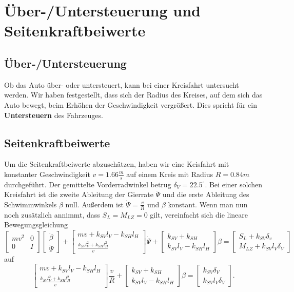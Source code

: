 \section{Über-/Untersteuerung und Seitenkraftbeiwerte}
\subsection{Über-/Untersteuerung}
Ob das Auto über- oder untersteuert, kann bei einer Kreisfahrt  untersucht werden. Wir haben festgestellt, dass sich der Radius des Kreises, auf dem sich das Auto bewegt, beim Erhöhen der Geschwindigkeit vergrößert. Dies spricht für ein \textbf{Untersteuern} des Fahrzeuges.

\subsection{Seitenkraftbeiwerte}

Um die Seitenkraftbeiwerte abzuschätzen, haben wir eine Keisfahrt mit konstanter Geschwindigkeit $v=1.66\frac{m}{s}$ auf einem Kreis mit Radius $R=0.84m$ durchgeführt. Der gemittelte Vorderradwinkel betrug $\delta_V=22.5^\circ$. Bei einer solchen Kreisfahrt ist die zweite Ableitung der Gierrate $\ddot{\Psi}$ und die erste Ableitung des Schwimmwinkels $ \beta$ null. Außerdem ist $\dot{\Psi}=\frac{v}{R}$ und $\beta$ konstant. Wenn man nun noch zusätzlich annimmt, dass $S_L=M_{LZ}=0$ gilt, vereinfacht sich die lineare Bewegungsgleichung
$$ \begin{bmatrix} 
mv^2 & 0 \\
0 & I 
\end{bmatrix} 
\begin{bmatrix} 
\dot{\beta} \\
\ddot{\Psi}
\end{bmatrix}+ 
\begin{bmatrix} 
mv+k_{SV}l_V-k_{SH}l_{H} \\
\frac{k_{SV}l_V^2+k_{SH}l_H^2}{v}  
\end{bmatrix} \dot{\Psi}+
\begin{bmatrix} 
k_{SV}+k_{SH} \\
k_{SV}l_V-k_{SH}l_H 
\end{bmatrix} \beta=
\begin{bmatrix} 
S_L+k_{SV}\delta_v \\
M_{LZ}+k_{SV}l_V\delta_V 
\end{bmatrix}
$$
auf 
$$  
\begin{bmatrix} 
mv+k_{SV}l_V-k_{SH}l_{H} \\
\frac{k_{SV}l_V^2+k_{SH}l_H^2}{v}  
\end{bmatrix} \frac{v}{R}+
\begin{bmatrix} 
k_{SV}+k_{SH} \\
k_{SV}l_V-k_{SH}l_H 
\end{bmatrix} \beta=
\begin{bmatrix} 
k_{SV}\delta_V \\
k_{SV}l_V\delta_V 
\end{bmatrix}.
$$

